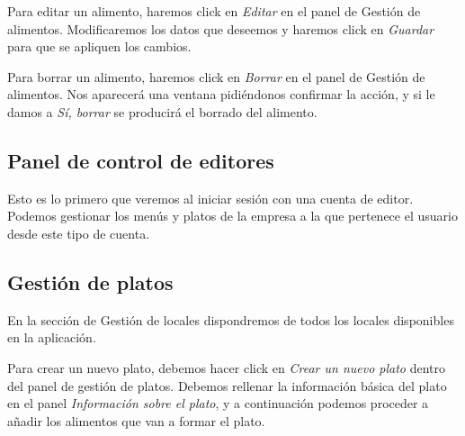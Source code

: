 

Para editar un alimento, haremos click en \textit{Editar} en el panel de Gestión de alimentos. Modificaremos los datos que deseemos y haremos click en \textit{Guardar} para que se apliquen los cambios.





Para borrar un alimento, haremos click en \textit{Borrar} en el panel de Gestión de alimentos. Nos aparecerá una ventana pidiéndonos confirmar la acción, y si le damos a \textit{Sí, borrar} se producirá el borrado del alimento.


\subsection{Panel de control de editores}

Esto es lo primero que veremos al iniciar sesión con una cuenta de editor. Podemos gestionar los menús y platos de la empresa a la que pertenece el usuario desde este tipo de cuenta.


\subsection{Gestión de platos}

En la sección de Gestión de locales dispondremos de todos los locales disponibles en la aplicación.


Para crear un nuevo plato, debemos hacer click en \textit{Crear un nuevo plato} dentro del panel de gestión de platos. Debemos rellenar la información básica del plato en el panel \textit{Información sobre el plato}, y a continuación podemos proceder a añadir los alimentos que van a formar el plato.

